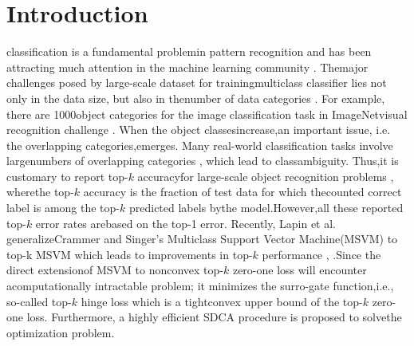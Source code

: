 \documentclass[journal]{IEEEtran}
\begin{document}
\section{Introduction}
classification is a fundamental problemin pattern recognition and has been attracting much attention in the machine learning community \cite{Bishop2006Pattern, Hsu2002comparison, Rifkin2004In, Yuan2012Recent, Rocha2014Multiclass}. Themajor challenges posed by large-scale dataset for trainingmulticlass classifier lies not only in the data size, but also in thenumber of data categories \cite{Deng2010What, Zhou2014Learning, Russakovsky2015Imagenet}. For example, there are 1000object categories for the image classification task in ImageNetvisual recognition challenge \cite{Russakovsky2015Imagenet}. When the object classesincrease,an important issue, i.e. the overlapping categories,emerges. Many real-world classification tasks involve largenumbers of overlapping categories \cite{Cai2007Exploiting}, which lead to classambiguity. Thus,it is customary to report top-$k$ accuracyfor large-scale object recognition problems \cite{Krizhevsky2012Imagenet, Simonyan2014Very, Szegedy2015Going, He2016Deep}, wherethe top-$k$ accuracy is the fraction of test data for which thecounted correct label is among the top-$k$ predicted labels bythe model.However,all these reported top-$k$ error rates arebased on the top-1 error. Recently, Lapin et al. generalizeCrammer and Singer's Multiclass Support Vector Machine(MSVM) \cite{Crammer2001algorithmic} to top-k MSVM which leads to improvements in top-$k$ performance \cite{Lapin2015Top}, \cite{Lapin2016Loss}.Since the direct extensionof MSVM to nonconvex top-$k$ zero-one loss will encounter acomputationally intractable problem; it minimizes the surro-gate function,i.e., so-called top-$k$ hinge loss which is a tightconvex upper bound of the top-$k$ zero-one loss. Furthermore, a highly efficient SDCA procedure \cite{Zhang2015Stochastic} is proposed to solvethe optimization problem.
\end{document}
